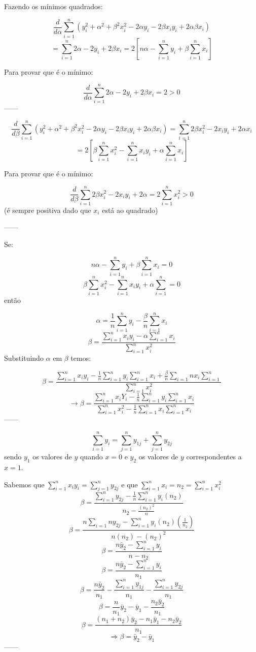 \documentclass[11pt,]{article}
\begin{document}
Fazendo os mínimos quadrados:

\[\frac{d}{d\alpha} \sum_{i=1}^n ( y_{i}^2 + \alpha^2 + \beta^2 x_{i}^2 - 2 \alpha y_{i} - 2 \beta x_{i} y_{i} + 2 \alpha \beta x_{i})\]
\[= \sum_{i=1}^n 2 \alpha - 2 y_{i} + 2 \beta x_{i} = 2 [n \alpha - \sum_{i=1}^n y_{i} + \beta \sum_{i=1}^n x_{i}]\]

Para provar que é o mínimo:

\[\frac{d}{d \alpha} \sum_{i=1}^n 2 \alpha - 2 y_{i} + 2 \beta x_{i} = 2 > 0\]
------

\[\frac{d}{d \beta} \sum_{i=1}^n ( y_{i}^2 + \alpha^2 + \beta^2 x_{i}^2 - 2 \alpha y_{i} - 2 \beta x_{i} y_{i} + 2 \alpha \beta x_{i}) = \sum_{i=1}^n 2 \beta x_{i}^2 - 2 x_{i} y_{i} +2 \alpha x_{i}\]
\[= 2 [\beta \sum_{i=1}^n x_{i}^2 - \sum_{i=1}^n x_{i} y_ {i} + \alpha \sum_{i=1}^n x_{i}]\]

Para provar que é o mínimo:

\[\frac{d}{d \beta} \sum_{i=1}^n 2 \beta x_{i}^2 - 2 x_{i} y_{i} +2 \alpha= 2 \sum_{i=1}^n x_{i}^2 >0\]
(é sempre positiva dado que \(x_{i}\) está ao quadrado)

------

Se:

\[n \alpha - \sum_{i=1}^n y_{i} + \beta \sum_{i=1}^n x_{i} = 0\]
\[\beta \sum_{i=1}^n x_{i}^2 - \sum_{i=1}^n x_{i} y_{i} + \alpha \sum_{i=1}^n = 0\]
então

\[\alpha = \frac{1}{n} \sum_{i=1}^n y_{i} - \frac{ \beta}{n} \sum_{i=1}^n x_{i}\]
\[\beta = \frac{ \sum_{i=1}^n x_{i} y_{i} - \alpha \sum_{i=1}^n x_{i}}{\sum_{i=1}^n x_{i}^2}\]
Substituindo \(\alpha\) em \(\beta\) temos:

\[\beta = \frac{ \sum_{i=1}^n x_{i} y_{i} - \frac{1}{n} \sum_{i=1}^n y_{i} \sum_{i=1}^n x_{i} + \frac{\beta}{n} \sum_{i=1}{n}x_{i} \sum_{i=1}^n} {\sum_{i=1}^n x_{i}^2}\]
\[\rightarrow \beta = \frac{\sum_{i=1}^n x_{i} Y_{i} - \frac{1}{n} \sum_{i=1}^n y_{i} \sum_{i=1}^n x_{i}}{\sum_{i=1}^n x_{i}^2 - \frac{1}{n} \sum_{i=1}^n x_{i} \sum_{i=1}^n x_{i}}\]
------

\[\sum_{i=1}^n y_{i}= \sum_{j=1}^n y_{1j} + \sum_{j=1}^n y_{2j}\] sendo
\(y_{1}\) os valores de \(y\) quando \(x=0\) e \(y_{2}\) os valores de
\(y\) correspondentes a \(x=1\).

Sabemos que \(\sum_{i=1}^n x_{i} y_{i} = \sum_{j=1}^ny_{2j}\) e que
\(\sum_{i=1}^n x_{i} = n_{2} = \sum_{i=1}^n x_{i}^2\)
\[\beta = \frac{\sum_{i=1}^n y_{2j} -  \frac{1}{n} \sum_{i=1}^n y_{i}(n_{2})}{n_{2}- \frac{(n_{2})^2}{n}}\]
\[\beta = \frac{n \sum_{i=1}{n}y_{2j} - \sum_{i=1}^n y_{i}(n_{2})(\frac{1}{n_{2}})}{n(n_{2})-(n_{2})^2}\]
\[\beta = \frac{n \bar y_{2} - \sum_{i=1}^n y_{i}}{n-n_{2}}\]
\[\beta = \frac{n \bar y_{2} - \sum_{i=1}^n y_{i}}{n_{1}}\]
\[\beta = \frac{n \bar y_{2}}{n_{1}} - \frac{ \sum_{i=1}^n y_{1j}}{n_{1}} - \frac{\sum_{i=1}^n y_{2j}}{n_{1}}\]
\[\beta = \frac{n}{n_{1}}\bar y_{2} - \bar y_{1} - \frac{n_{2} \bar y_{2}}{n_{1}}\]
\[\beta = \frac{(n_{1}+n_{2})\bar y_{2} - n_{1}\bar y_{1} - n_{2} \bar y_{2}}{n_{1}}\]
\[\Rightarrow \beta = \bar y_{2} - \bar y_{1}\] ------
\end{document}
